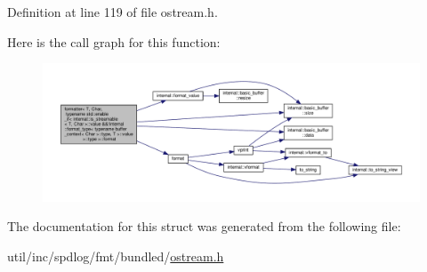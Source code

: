 Definition at line 119 of file ostream.\+h.

Here is the call graph for this function\+:
\nopagebreak
\begin{figure}[H]
\begin{center}
\leavevmode
\includegraphics[width=350pt]{structformatter_3_01_t_00_01_char_00_01typename_01std_1_1enable__if_3_01internal_1_1is__streamabdfe791f5d6e0a8acd43f884d0761b8af_ae9b195822bae194b4006b061c16eaa0a_cgraph}
\end{center}
\end{figure}


The documentation for this struct was generated from the following file\+:\begin{DoxyCompactItemize}
\item 
util/inc/spdlog/fmt/bundled/\hyperlink{ostream_8h}{ostream.\+h}\end{DoxyCompactItemize}
